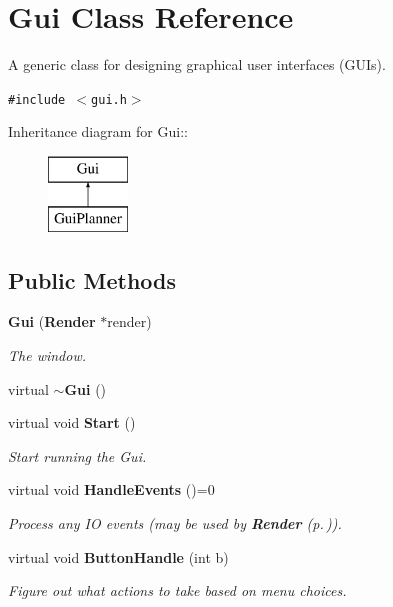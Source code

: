 \section{Gui  Class Reference}
\label{class_Gui}
A generic class for designing graphical user interfaces (GUIs). 


{\tt \#include $<$gui.h$>$}

Inheritance diagram for Gui::\begin{figure}[H]
\begin{center}
\leavevmode
\includegraphics[height=2cm]{class_Gui}
\end{center}
\end{figure}
\subsection*{Public Methods}
\begin{CompactItemize}
\item 
{\bf Gui} ({\bf Render} $\ast$render)
\begin{CompactList}\small\item\em The window.\item\end{CompactList}\item 
virtual {\bf $\sim$Gui} ()
\item 
virtual void {\bf Start} ()
\begin{CompactList}\small\item\em Start running the Gui.\item\end{CompactList}\item 
virtual void {\bf Handle\-Events} ()=0
\begin{CompactList}\small\item\em Process any IO events (may be used by {\bf Render} {\rm (p.\,\pageref{class_Render})}).\item\end{CompactList}\item 
virtual void {\bf Button\-Handle} (int b)
\begin{CompactList}\small\item\em Figure out what actions to take based on menu choices.\item\end{CompactList}\end{CompactItemize}
